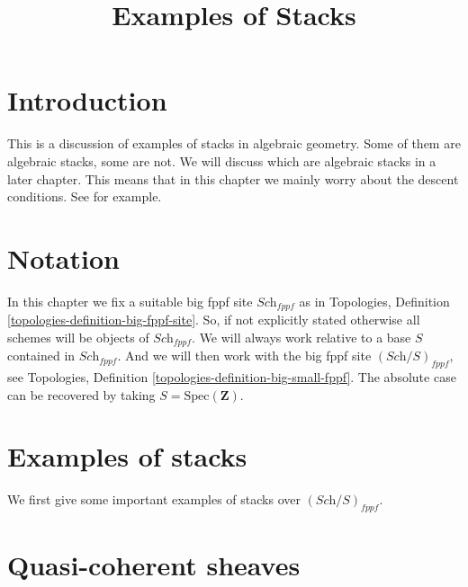 

%


\title{Examples of Stacks}


\maketitle

\label{section-phantom}

\tableofcontents

\section{Introduction}
\label{section-introduction}

\noindent
This is a discussion of examples of stacks in algebraic geometry.
Some of them are algebraic stacks, some are not.
We will discuss which are algebraic stacks in a later chapter.
This means that in this chapter we mainly worry about the descent
conditions. See \cite{Vis2} for example.




\section{Notation}
\label{section-notation}

\noindent
In this chapter we fix a suitable big fppf site $\textit{Sch}_{fppf}$
as in Topologies, Definition \ref{topologies-definition-big-fppf-site}.
So, if not explicitly stated otherwise all schemes will be objects
of $\textit{Sch}_{fppf}$.
We will always work relative to a base $S$ contained in $\textit{Sch}_{fppf}$.
And we will then work with the big fppf site $(\textit{Sch}/S)_{fppf}$,
see Topologies, Definition \ref{topologies-definition-big-small-fppf}.
The absolute case can be recovered by taking
$S = \text{Spec}(\mathbf{Z})$.
 



\section{Examples of stacks}
\label{section-examples-stacks}

\noindent
We first give some important examples of stacks over
$(\textit{Sch}/S)_{fppf}$.





\section{Quasi-coherent sheaves}
\label{section-stack-of-quasi-coherent-sheaves}

